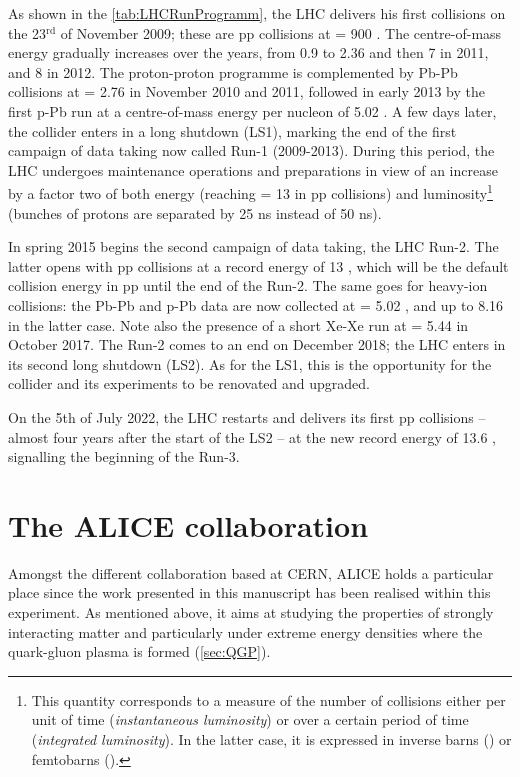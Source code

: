 As shown in the \tab\ref{tab:LHCRunProgramm}, the LHC delivers his first collisions on the 23$^{\textrm{rd}}$ of November 2009; these are pp collisions at \sqrtS = 900 \gev. The centre-of-mass energy gradually increases over the years, from 0.9 \tev to 2.36 and then 7 \tev in 2011, and 8 \tev in 2012. The proton-proton programme is complemented by Pb-Pb collisions at \sqrtSnn = 2.76 \tev in November 2010 and 2011, followed in early 2013 by the first p-Pb run at a centre-of-mass energy per nucleon of 5.02 \tev. A few days later, the collider enters in a long shutdown (LS1), marking the end of the first campaign of data taking now called Run-1 (2009-2013). During this period, the LHC undergoes maintenance operations and preparations in view of an increase by a factor two of both energy (reaching \sqrtS = 13 \tev in pp collisions) and luminosity\footnote{This quantity corresponds to a measure of the number of collisions either per unit of time (\textit{instantaneous luminosity}) or over a certain period of time (\textit{integrated luminosity}). In the latter case, it is expressed in inverse barns (\invb) or femtobarns (\invfb).} (bunches of protons are separated by 25 ns instead of 50 ns).

In spring 2015 begins the second campaign of data taking, the LHC Run-2. The latter opens with pp collisions at a record energy of 13 \tev, which will be the default collision energy in pp until the end of the Run-2. The same goes for heavy-ion collisions: the Pb-Pb and p-Pb data are now collected at \sqrtSnn = 5.02 \tev, and up to 8.16 \tev in the latter case. Note also the presence of a short Xe-Xe run at \sqrtSnn = 5.44 \tev in October 2017. The Run-2 comes to an end on December 2018; the LHC enters in its second long shutdown (LS2). As for the LS1, this is the opportunity for the collider and its experiments to be renovated and upgraded. 

On the 5th of July 2022, the LHC restarts and delivers its first pp collisions -- almost four years after the start of the LS2 -- at the new record energy of 13.6 \tev, signalling the beginning of the Run-3.

\section{The ALICE collaboration}
\label{sec:ALICECollaboration}

Amongst the different collaboration based at CERN, ALICE holds a particular place since the work presented in this manuscript has been realised within this experiment. As mentioned above, it aims at studying the properties of strongly interacting matter and particularly under extreme energy densities where the quark-gluon plasma is formed (\Sec\ref{sec:QGP}). 

